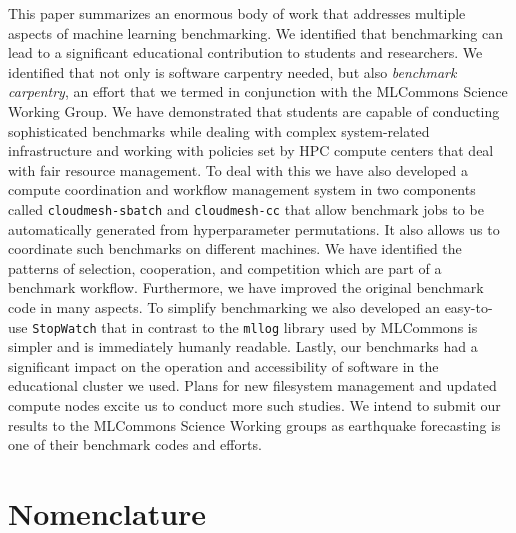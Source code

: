 \documentclass[utf8]{FrontiersinVancouver} %
\newcommand{\TODO}[2]{\todo[inline]{{\bf \color{red} #1} #2}}
\begin{document}
This paper summarizes an enormous body of work that addresses multiple
aspects of machine learning benchmarking. We identified that
benchmarking can lead to a significant educational contribution to
students and researchers. We identified that not only is software
carpentry needed, but also {\em benchmark carpentry}, an effort that we termed in conjunction
with the MLCommons Science Working Group. We have
demonstrated that students are capable of conducting sophisticated
benchmarks while dealing with complex system-related infrastructure
and working with policies set by HPC compute centers that deal with
fair resource management. To deal with this we have also developed a
compute coordination and workflow management system in two components
called \verb|cloudmesh-sbatch| and \verb|cloudmesh-cc| that allow benchmark jobs to
be automatically generated from hyperparameter permutations. It also
allows us to coordinate such benchmarks on different machines. We have
identified the patterns of selection, cooperation, and competition
which are part of a benchmark workflow. Furthermore, we have improved
the original benchmark code in many aspects. To simplify benchmarking
we also developed an easy-to-use \verb|StopWatch| that in contrast to the
\verb|mllog| library used by MLCommons is simpler and is immediately humanly
readable. Lastly, our benchmarks had a significant impact on the
operation and accessibility of software in the educational cluster we
used. Plans for new filesystem management and updated compute nodes
excite us to conduct more such studies. We intend to submit our
results to the MLCommons Science Working groups as earthquake
forecasting is one of their benchmark codes and efforts.

\clearpage

\section{Nomenclature}
\end{document}
